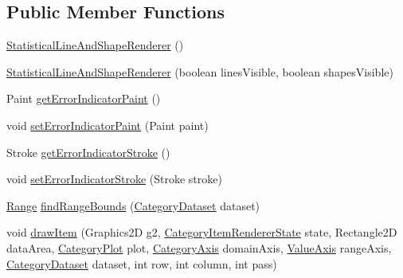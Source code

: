\subsection*{Public Member Functions}
\begin{DoxyCompactItemize}
\item 
\mbox{\hyperlink{classorg_1_1jfree_1_1chart_1_1renderer_1_1category_1_1_statistical_line_and_shape_renderer_aaab2c171744659fc7b1f61c98842caf5}{Statistical\+Line\+And\+Shape\+Renderer}} ()
\item 
\mbox{\hyperlink{classorg_1_1jfree_1_1chart_1_1renderer_1_1category_1_1_statistical_line_and_shape_renderer_a8cad23861714d385a7c0b3ed358bfeb1}{Statistical\+Line\+And\+Shape\+Renderer}} (boolean lines\+Visible, boolean shapes\+Visible)
\item 
Paint \mbox{\hyperlink{classorg_1_1jfree_1_1chart_1_1renderer_1_1category_1_1_statistical_line_and_shape_renderer_ab44c842ea85e2436b2d32698acc19555}{get\+Error\+Indicator\+Paint}} ()
\item 
void \mbox{\hyperlink{classorg_1_1jfree_1_1chart_1_1renderer_1_1category_1_1_statistical_line_and_shape_renderer_a7053e48faecf8eabb4ab8e5648ca115c}{set\+Error\+Indicator\+Paint}} (Paint paint)
\item 
Stroke \mbox{\hyperlink{classorg_1_1jfree_1_1chart_1_1renderer_1_1category_1_1_statistical_line_and_shape_renderer_aa75d2c78f34a50fbf11a89fc26bb78af}{get\+Error\+Indicator\+Stroke}} ()
\item 
void \mbox{\hyperlink{classorg_1_1jfree_1_1chart_1_1renderer_1_1category_1_1_statistical_line_and_shape_renderer_a488c9add706c96aa5fb2e4fcb00a7a1c}{set\+Error\+Indicator\+Stroke}} (Stroke stroke)
\item 
\mbox{\hyperlink{classorg_1_1jfree_1_1data_1_1_range}{Range}} \mbox{\hyperlink{classorg_1_1jfree_1_1chart_1_1renderer_1_1category_1_1_statistical_line_and_shape_renderer_a3fd2f24f87b901eceec2f29e1a77ba3b}{find\+Range\+Bounds}} (\mbox{\hyperlink{interfaceorg_1_1jfree_1_1data_1_1category_1_1_category_dataset}{Category\+Dataset}} dataset)
\item 
void \mbox{\hyperlink{classorg_1_1jfree_1_1chart_1_1renderer_1_1category_1_1_statistical_line_and_shape_renderer_afec286f0008970ac879fa0ceeb9331bc}{draw\+Item}} (Graphics2D g2, \mbox{\hyperlink{classorg_1_1jfree_1_1chart_1_1renderer_1_1category_1_1_category_item_renderer_state}{Category\+Item\+Renderer\+State}} state, Rectangle2D data\+Area, \mbox{\hyperlink{classorg_1_1jfree_1_1chart_1_1plot_1_1_category_plot}{Category\+Plot}} plot, \mbox{\hyperlink{classorg_1_1jfree_1_1chart_1_1axis_1_1_category_axis}{Category\+Axis}} domain\+Axis, \mbox{\hyperlink{classorg_1_1jfree_1_1chart_1_1axis_1_1_value_axis}{Value\+Axis}} range\+Axis, \mbox{\hyperlink{interfaceorg_1_1jfree_1_1data_1_1category_1_1_category_dataset}{Category\+Dataset}} dataset, int row, int column, int pass)

\end{DoxyCompactItemize}
